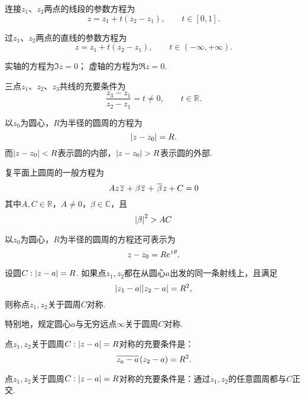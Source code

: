 \begin{example}[线段]
连接\(z_1\)、\(z_2\)两点的线段的参数方程为\[
z = z_1 + t(z_2 - z_1), \qquad t \in [0,1].
\]
\end{example}

\begin{example}[直线]
过\(z_1\)、\(z_2\)两点的直线的参数方程为\[
z = z_1 + t(z_2 - z_1), \qquad t \in (-\infty,+\infty).
\]

实轴的方程为\(\Im z = 0\)；
虚轴的方程为\(\Re z = 0\).
\end{example}

\begin{example}[三点共线的充要条件]
三点\(z_1\)、\(z_2\)、\(z_3\)共线的充要条件为\[
\frac{z_3 - z_1}{z_2 - z_1} = t \neq 0, \qquad t \in \mathbb{R}.
\]
\end{example}

\begin{example}[圆]
以\(z_0\)为圆心，\(R\)为半径的圆周的方程为\[
\abs{z - z_0} = R.
\]而\(\abs{z-z_0}<R\)表示圆的内部，\(\abs{z-z_0}>R\)表示圆的外部.

复平面上圆周的一般方程为\[
A z \kern1pt\overline{z}\kern1pt + \beta \kern1pt\overline{z}\kern1pt + \kern1pt\overline{\beta}\kern1pt z + C = 0
\]其中\(A,C\in\mathbb{R}\)，\(A \neq 0\)，\(\beta\in\mathbb{C}\)，且\[
\abs{\beta}^2 > AC
\]

以\(z_0\)为圆心，\(R\)为半径的圆周的方程还可表示为\[
z - z_0 = R e^{\kern1pt\mathrm{i}\kern1pt \theta}.
\]
\end{example}

\begin{definition}
设圆\(C: \abs{z - a} = R\).
如果点\(z_1,z_2\)都在从圆心\(a\)出发的同一条射线上，且满足\[
\abs{z_1 - a} \abs{z_2 - a} = R^2,
\]则称点\(z_1,z_2\)关于圆周\(C\)对称.

特别地，规定圆心\(a\)与无穷远点\(\infty\)关于圆周\(C\)对称.
\end{definition}

\begin{theorem}
点\(z_1,z_2\)关于圆周\(C: \abs{z - a} = R\)对称的充要条件是：\[
\kern1pt\overline{z_a - a}\kern1pt (z_2 - a) = R^2.
\]
\end{theorem}

\begin{theorem}
点\(z_1,z_2\)关于圆周\(C: \abs{z - a} = R\)对称的充要条件是：通过\(z_1,z_2\)的任意圆周都与\(C\)正交.
\end{theorem}

\endgroup